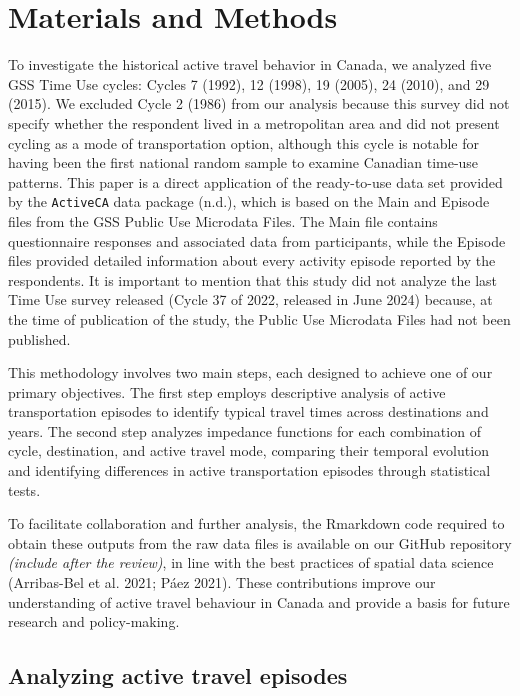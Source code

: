 \documentclass[preprint, 3p,
authoryear]{elsarticle} %
\begin{document}
\hypertarget{materials-and-methods}{%
\section{Materials and Methods}\label{materials-and-methods}}

To investigate the historical active travel behavior in Canada, we
analyzed five GSS Time Use cycles: Cycles 7 (1992), 12 (1998), 19
(2005), 24 (2010), and 29 (2015). We excluded Cycle 2 (1986) from our
analysis because this survey did not specify whether the respondent
lived in a metropolitan area and did not present cycling as a mode of
transportation option, although this cycle is notable for having been
the first national random sample to examine Canadian time-use patterns.
This paper is a direct application of the ready-to-use data set provided
by the \texttt{ActiveCA} data package (n.d.), which is based on the Main
and Episode files from the GSS Public Use Microdata Files. The Main file
contains questionnaire responses and associated data from participants,
while the Episode files provided detailed information about every
activity episode reported by the respondents. It is important to mention
that this study did not analyze the last Time Use survey released (Cycle
37 of 2022, released in June 2024) because, at the time of publication
of the study, the Public Use Microdata Files had not been published.

This methodology involves two main steps, each designed to achieve one
of our primary objectives. The first step employs descriptive analysis
of active transportation episodes to identify typical travel times
across destinations and years. The second step analyzes impedance
functions for each combination of cycle, destination, and active travel
mode, comparing their temporal evolution and identifying differences in
active transportation episodes through statistical tests.

To facilitate collaboration and further analysis, the Rmarkdown code
required to obtain these outputs from the raw data files is available on
our GitHub repository \emph{(include after the review)}, in line with
the best practices of spatial data science (Arribas-Bel et al. 2021;
Páez 2021). These contributions improve our understanding of active
travel behaviour in Canada and provide a basis for future research and
policy-making.

\hypertarget{analyzing-active-travel-episodes}{%
\subsection{Analyzing active travel
episodes}\label{analyzing-active-travel-episodes}}
\end{document}
